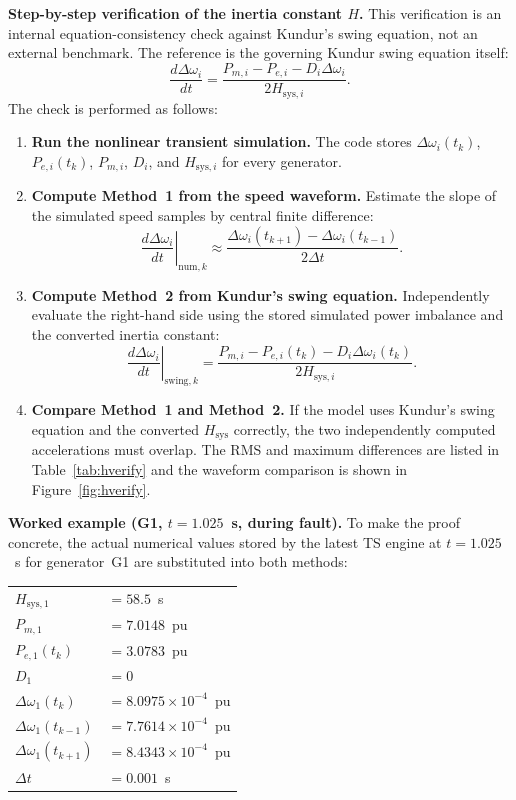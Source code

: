 \documentclass[12pt,a4paper]{article}
\begin{document}
\noindent\textbf{Step-by-step verification of the inertia constant $H$.}
This verification is an internal equation-consistency check against Kundur's
swing equation, not an external benchmark. The reference is the governing
Kundur swing equation itself:
\begin{equation}
    \frac{d\Delta\omega_i}{dt}
    =\frac{P_{m,i}-P_{e,i}-D_i\Delta\omega_i}{2H_{\mathrm{sys},i}}.
    \label{eq:h_verify}
\end{equation}
The check is performed as follows:
\begin{enumerate}
    \item \textbf{Run the nonlinear transient simulation.} The code stores
          $\Delta\omega_i(t_k)$, $P_{e,i}(t_k)$, $P_{m,i}$, $D_i$, and
          $H_{\mathrm{sys},i}$ for every generator.
    \item \textbf{Compute Method~1 from the speed waveform.} Estimate the slope
          of the simulated speed samples by central finite difference:
          \[
          \left.\frac{d\Delta\omega_i}{dt}\right|_{\mathrm{num},k}
          \approx
          \frac{\Delta\omega_i(t_{k+1})-\Delta\omega_i(t_{k-1})}
               {2\Delta t}.
          \]
    \item \textbf{Compute Method~2 from Kundur's swing equation.} Independently
          evaluate the right-hand side using the stored simulated power
          imbalance and the converted inertia constant:
          \[
          \left.\frac{d\Delta\omega_i}{dt}\right|_{\mathrm{swing},k}
          =
          \frac{P_{m,i}-P_{e,i}(t_k)-D_i\Delta\omega_i(t_k)}
               {2H_{\mathrm{sys},i}}.
          \]
    \item \textbf{Compare Method~1 and Method~2.} If the model uses Kundur's
          swing equation and the converted $H_{\mathrm{sys}}$ correctly, the two
          independently computed accelerations must overlap. The RMS and
          maximum differences are listed in Table~\ref{tab:hverify} and the
          waveform comparison is shown in Figure~\ref{fig:hverify}.
\end{enumerate}

\noindent\textbf{Worked example (G1, $t=1.025$~s, during fault).}
To make the proof concrete, the actual numerical values stored by the latest
TS engine at $t=1.025$~s for generator~G1 are substituted into both methods:

\begin{center}
\begin{tabular}{ll}
$H_{\mathrm{sys},1}$ & $= 58.5$~s \\
$P_{m,1}$ & $= 7.0148$~pu \\
$P_{e,1}(t_k)$ & $= 3.0783$~pu \\
$D_1$ & $= 0$ \\
$\Delta\omega_1(t_k)$ & $= 8.0975\times10^{-4}$~pu \\
$\Delta\omega_1(t_{k-1})$ & $= 7.7614\times10^{-4}$~pu \\
$\Delta\omega_1(t_{k+1})$ & $= 8.4343\times10^{-4}$~pu \\
$\Delta t$ & $= 0.001$~s \\
\end{tabular}
\end{center}
\end{document}
